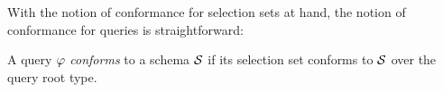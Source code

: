 With the notion of conformance for selection sets at hand, the notion
of conformance for queries is straightforward:

\begin{definition}
A \gql query $\varphi$ \textit{conforms} to a schema $\mathcal{S}$ if its selection set conforms to $\mathcal{S}$ over the query root type.
\end{definition}


